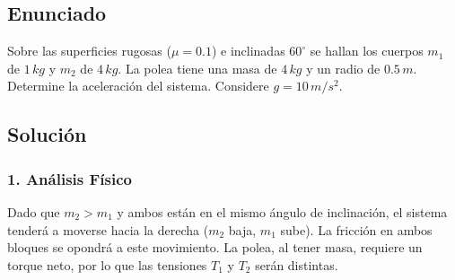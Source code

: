 \documentclass[12pt, a4paper]{article}
\begin{document}
\newpage

\subsection*{Enunciado}
Sobre las superficies rugosas ($\mu = 0.1$) e inclinadas $60^\circ$ se hallan los cuerpos $m_1$ de $1 \, \si{kg}$ y $m_2$ de $4 \, \si{kg}$. La polea tiene una masa de $4 \, \si{kg}$ y un radio de $0.5 \, \si{m}$. Determine la aceleración del sistema. Considere $g = 10 \, \si{m/s^2}$.

\begin{center}
\end{center}

\subsection*{Solución}

\subsubsection*{1. Análisis Físico}
Dado que $m_2 > m_1$ y ambos están en el mismo ángulo de inclinación, el sistema tenderá a moverse hacia la derecha ($m_2$ baja, $m_1$ sube). La fricción en ambos bloques se opondrá a este movimiento. La polea, al tener masa, requiere un torque neto, por lo que las tensiones $T_1$ y $T_2$ serán distintas.
\end{document}
